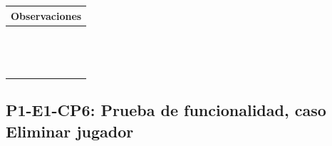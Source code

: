 \documentclass[oneside,10pt]{book}
\begin{document}
\begin{tabularx}{\textwidth}{ X }
\multicolumn{1}{X}{\cellcolor[HTML]{9B9B9B}\textbf{Observaciones}} \\ \hline
\multicolumn{1}{|l|}{ }	\\
\multicolumn{1}{|l|}{ }	\\
\multicolumn{1}{|l|}{ }	\\
\multicolumn{1}{|l|}{ }	\\
\multicolumn{1}{|l|}{ }	\\
\multicolumn{1}{|l|}{ }	\\
\multicolumn{1}{|l|}{ }	\\
\multicolumn{1}{|l|}{ }	\\
\multicolumn{1}{|l|}{ }	\\
\multicolumn{1}{|l|}{ }	\\
\multicolumn{1}{|l|}{ }	\\
\multicolumn{1}{|l|}{ }	\\
\multicolumn{1}{|l|}{ }	\\
\multicolumn{1}{|l|}{ }	\\ \hline
\end{tabularx}
\newpage
\subsection{P1-E1-CP6: Prueba de funcionalidad, caso Eliminar jugador}
\end{document}
